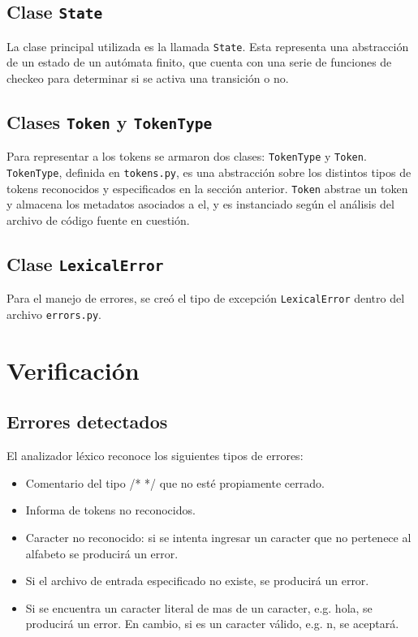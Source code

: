 \documentclass [a4paper,titlepage]{report}
\begin{document}
\subsection{Clase \texttt{State}}

La clase principal utilizada es la llamada \texttt{State}. Esta
representa una abstracción de un estado de un autómata
finito, que cuenta con una serie de funciones de checkeo para
determinar si se activa una transición o no.

\subsection{Clases \texttt{Token} y \texttt{TokenType}}

Para representar a los tokens se armaron dos clases:
\texttt{TokenType} y \texttt{Token}. \texttt{TokenType}, definida en
\texttt{tokens.py}, es una abstracción sobre los distintos tipos de
tokens reconocidos y especificados en la sección anterior.
\texttt{Token} abstrae un token y almacena los metadatos asociados a
el, y es instanciado según el análisis del archivo de código fuente
en cuestión.

\subsection{Clase \texttt{LexicalError}}

Para el manejo de errores, se creó el tipo de excepción
\texttt{LexicalError} dentro del archivo \texttt{errors.py}.

\section{Verificación}

\subsection{Errores detectados}

El analizador léxico reconoce los siguientes tipos de errores:

\begin{itemize}

\item Comentario del tipo /* */ que no esté propiamente cerrado.

\item Informa de tokens no reconocidos.

\item Caracter no reconocido: si se intenta ingresar un caracter que
no pertenece al alfabeto se producirá un error.

\item Si el archivo de entrada especificado no existe, se producirá un
error.

\item Si se encuentra un caracter literal de mas de un caracter, e.g.
\textquotesingle{}hola\textquotesingle{}, se producirá un error. En
cambio, si es un caracter válido, e.g.
\textquotesingle{}n\textquotesingle{}, se aceptará.

\end{itemize}
\end{document}
